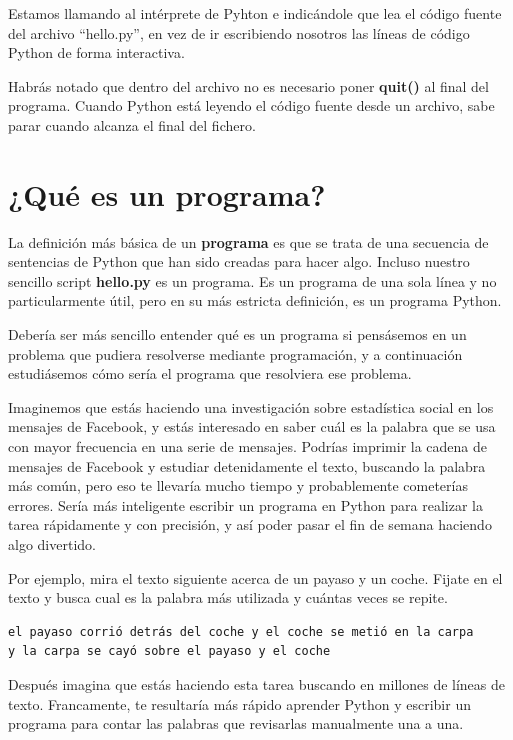 Estamos llamando al intérprete de Pyhton e indicándole que lea el código fuente del
archivo ``hello.py'', en vez de ir escribiendo nosotros las líneas de código Python
de forma interactiva.

Habrás notado que dentro del archivo no es necesario poner {\bf quit()}
al final del programa. Cuando Python está leyendo el código fuente
desde un archivo, sabe parar cuando alcanza el final del fichero.

\section{¿Qué es un programa?}

La definición más básica de un {\bf programa} es que se trata de una
secuencia de sentencias de Python que han sido creadas para hacer algo.
Incluso nuestro sencillo script {\bf hello.py} es un programa. Es un programa
de una sola línea y no particularmente útil, pero en su más estricta definición,
es un programa Python. 

Debería ser más sencillo entender qué es un programa si pensásemos en un problema
que pudiera resolverse mediante programación, y a continuación estudiásemos cómo sería el
programa que resolviera ese problema.

Imaginemos que estás haciendo una investigación sobre estadística social en los mensajes
de Facebook, y estás interesado en saber cuál es la palabra que se usa con mayor frecuencia
en una serie de mensajes. Podrías imprimir la cadena de mensajes de Facebook y estudiar
detenidamente el texto, buscando la palabra más común, pero eso te llevaría mucho tiempo
y probablemente cometerías errores. Sería más inteligente escribir un programa
en Python para realizar la tarea rápidamente y con precisión, y así poder pasar el fin
de semana haciendo algo divertido.

Por ejemplo, mira el texto siguiente acerca de un payaso y un coche. Fijate en el
texto y busca cual es la palabra más utilizada y cuántas veces se repite.

\beforeverb
\begin{verbatim}
el payaso corrió detrás del coche y el coche se metió en la carpa
y la carpa se cayó sobre el payaso y el coche
\end{verbatim}
\afterverb
%
Después imagina que estás haciendo esta tarea buscando en millones de líneas de
texto. Francamente, te resultaría más rápido aprender Python y escribir un
programa para contar las palabras que revisarlas manualmente una a una.

